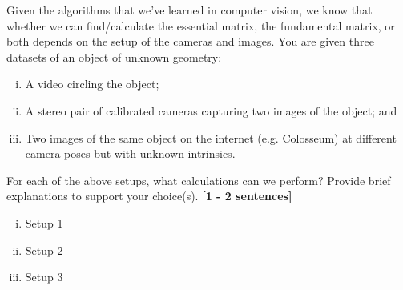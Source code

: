 \documentclass{csci1430}
\begin{document}
\pagebreak

\begin{question}[points=10,drawbox=false]
Given the algorithms that we've learned in computer vision, we know that whether we can find/calculate the essential matrix, the fundamental matrix, or both depends on the setup of the cameras and images. You are given three datasets of an object of unknown geometry:

\begin{enumerate}[(i)]
\item A video circling the object;
\item A stereo pair of calibrated cameras capturing two images of the object; and
\item Two images of the same object on the internet (e.g. Colosseum) at different camera poses but with unknown intrinsics.
\end{enumerate}
\end{question}

\begin{orangebox}[points=3]
For each of the above setups, what calculations can we perform? Provide brief explanations to support your choice(s). \textbf{[1 - 2 sentences]}
\end{orangebox}
\begin{enumerate}[(i)]
\item Setup 1

\item Setup 2

\item Setup 3

\end{enumerate}
\end{document}
